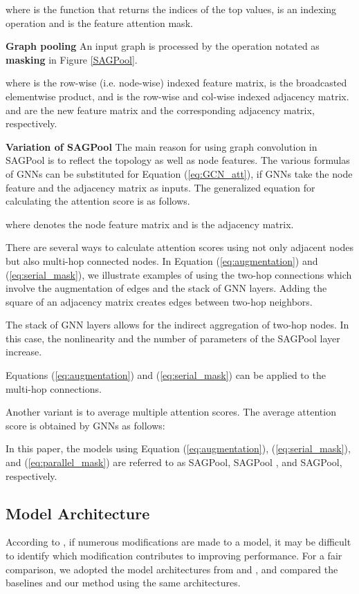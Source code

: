 \documentclass{article}
\begin{document}
where  is the function that returns the indices of the top  values,  is an indexing operation and   is the feature attention mask. 

\textbf{Graph pooling}
An input graph is processed by the operation notated as \textbf{masking} in Figure \ref{SAGPool}.

where  is the row-wise (i.e. node-wise) indexed feature matrix,  is the broadcasted elementwise product, and  is the row-wise and col-wise indexed adjacency matrix.  and  are the new feature matrix and the corresponding adjacency matrix, respectively. 

\textbf{Variation of SAGPool}
The main reason for using graph convolution in SAGPool is to reflect the topology as well as node features. The various formulas of GNNs can be substituted for Equation (\ref{eq:GCN_att}), if GNNs take the node feature and the adjacency matrix as inputs. The generalized equation for calculating the attention score  is as follows.

where  denotes the node feature matrix and  is the adjacency matrix.

There are several ways to calculate attention scores using not only adjacent nodes but also multi-hop connected nodes. In Equation (\ref{eq:augmentation}) and (\ref{eq:serial_mask}), we illustrate examples of using the two-hop connections which involve the augmentation of edges and the stack of GNN layers. Adding the square of an adjacency matrix creates edges between two-hop neighbors. 

The stack of GNN layers allows for the indirect aggregation of two-hop nodes. In this case, the nonlinearity and the number of parameters of the SAGPool layer increase. 

Equations (\ref{eq:augmentation}) and (\ref{eq:serial_mask}) can be applied to the multi-hop connections.

Another variant is to average multiple attention scores. The average attention score is obtained by  GNNs as follows: 


In this paper, the models using Equation (\ref{eq:augmentation}), (\ref{eq:serial_mask}), and (\ref{eq:parallel_mask}) are referred to as SAGPool, SAGPool , and SAGPool, respectively.


\subsection{Model Architecture}
\label{method:architecture}
According to \citeauthor{lipton2018troubling}, if numerous modifications are made to a model, it may be difficult to identify which modification contributes to improving performance. For a fair comparison, we adopted the model architectures from \citeauthor{zhang2018end} and \citeauthor{cangea2018towards}, and compared the baselines and our method using the same architectures.
\end{document}
